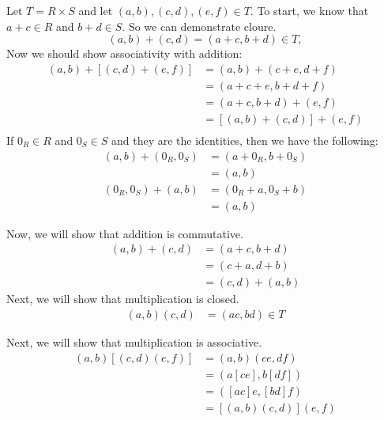 \documentclass[12pt]{report}
\begin{document}
\sol Let $T = R \times S$ and let $(a,b), (c,d), (e,f) \in T$. To start, we know that $a+ c \in R$ and $b+d \in S$. So we can demonstrate cloure.
$$(a, b) + (c, d) = (a + c, b + d) \in T,$$
Now we should show associativity with addition:
\begin{align*}
    (a, b) + [(c, d) + (e, f)] &= (a, b) + (c + e, d + f) \\
    &= (a + c + e, b + d + f) \\
    &= (a + c, b + d) + (e, f) \\
    &= [(a, b) + (c, d)] + (e, f) \\
\end{align*}
If $0_R \in R$ and $0_S \in S$ and they are the identities, then we have the following:
\begin{align*}
    (a, b) + (0_R, 0_S) &= (a + 0_R, b + 0_S) \\
    &= (a, b) \\
    (0_R, 0_S) + (a, b) &= (0_R + a, 0_S + b) \\
    &= (a, b)
\end{align*}

Now, we will show that addition is commutative. 
\begin{align*}
    (a,b) + (c,d) &= (a + c, b + d) \\
    &= (c + a, d + b) \\
    &= (c,d) + (a,b)
\end{align*}
Next, we will show that multiplication is closed.
\begin{align*}
    (a,b)(c, d) &= (ac, bd) \in T
\end{align*}

Next, we will show that multiplication is associative.
\begin{align*}
    (a,b)[(c,d)(e,f)] &= (a,b)(ce, df) \\
    &= (a[ce], b[df]) \\
    &= ([ac]e, [bd]f) \\
    &= [(a,b)(c,d)](e,f)
\end{align*}
\end{document}
